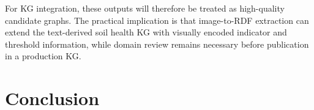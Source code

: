 \documentclass[preprint,12pt]{elsarticle}
\begin{document}


For KG integration, these outputs will therefore be treated as high-quality candidate graphs. The practical implication is that image-to-RDF extraction can extend the text-derived soil health KG with visually encoded indicator and threshold information, while domain review remains necessary before publication in a production KG.

\section{Conclusion}\label{sec:conclusion}
\end{document}
